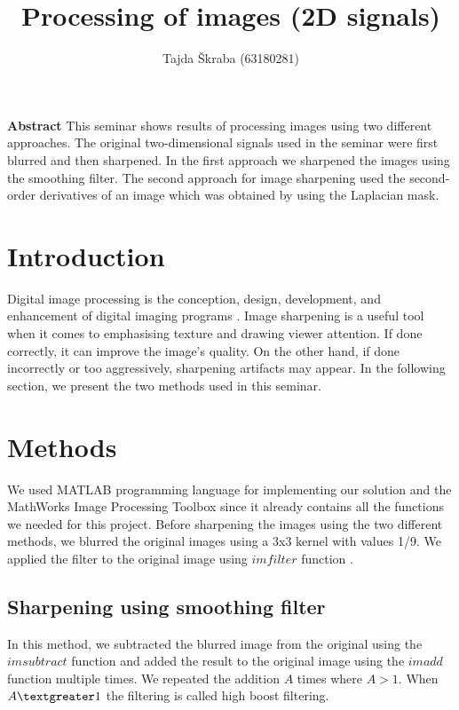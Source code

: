 \documentclass{article}
\title{Processing of images (2D signals)}
\author{Tajda Škraba (63180281)}
\date{}
\begin{document}
\maketitle {}

\textbf{Abstract} \newline
This seminar shows results of processing images using two different approaches. The original two-dimensional signals used in the seminar were first blurred and then sharpened. In the first approach we sharpened the images using the smoothing filter. The second approach for image sharpening used the second-order derivatives of an image which was obtained by using the Laplacian mask.
\section{Introduction}
Digital image processing is the conception, design, development, and enhancement of digital imaging programs \cite{io}.
Image sharpening is a useful tool when it comes to emphasising texture and drawing viewer attention. If done correctly, it can improve the image's quality. On the other hand, if done incorrectly or too aggressively, sharpening artifacts may appear. In the following section, we present the two methods used in this seminar.
\section{Methods}
We used MATLAB programming language for implementing our solution and the MathWorks Image Processing Toolbox \cite{ena} since it already contains all the functions we needed for this project. \newline
\newline
Before sharpening the images using the two different methods, we blurred the original images using a 3x3 kernel with values 1/9. We applied the filter to the original image using  $imfilter$ function \cite{dva}.
\subsection{Sharpening using smoothing filter}
In this method, we subtracted the blurred image from the original using the $imsubtract$ function \cite{tri} and added the result to the original image using the $imadd$ function \cite{stiri} multiple times. We repeated the addition $A$ times where $A > 1$. When $A\textgreater 1$ the filtering is called high boost filtering.
\end{document}
